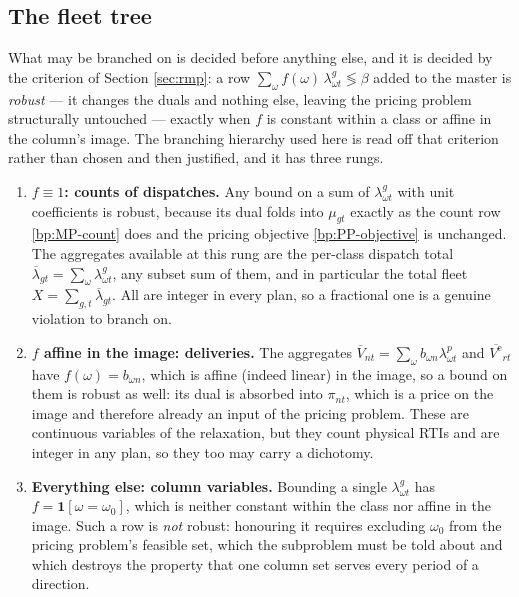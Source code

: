 \subsection{The fleet tree}
\label{sec:branching}

What may be branched on is decided before anything else, and it is
decided by the criterion of Section \ref{sec:rmp}: a row
$\sum_{\omega}f(\omega)\,\lambda^{g}_{\omega t}\lessgtr\beta$ added to
the master is \emph{robust} --- it changes the duals and nothing else,
leaving the pricing problem structurally untouched --- exactly when
$f$ is constant within a class or affine in the column's image. The
branching hierarchy used here is read off that criterion rather than
chosen and then justified, and it has three rungs.

\begin{enumerate}
\item \textbf{$f\equiv1$: counts of dispatches.} Any bound on a sum of
  $\lambda^{g}_{\omega t}$ with unit coefficients is robust, because its
  dual folds into $\mu_{gt}$ exactly as the count row
  \eqref{bp:MP-count} does and the pricing objective
  \eqref{bp:PP-objective} is unchanged. The aggregates available at
  this rung are the per-class dispatch total
  $\overline{\lambda}_{gt}=\sum_{\omega}\lambda^{g}_{\omega t}$, any
  subset sum of them, and in particular the total fleet
  $X=\sum_{g,t}\overline{\lambda}_{gt}$. All are integer in every plan,
  so a fractional one is a genuine violation to branch on.
\item \textbf{$f$ affine in the image: deliveries.} The aggregates
  $\overline{V}_{nt}=\sum_{\omega}b_{\omega n}\lambda^{p}_{\omega t}$
  and $\overline{V^{\mathrm{e}}}_{rt}$ have $f(\omega)=b_{\omega n}$,
  which is affine (indeed linear) in the image, so a bound on them is
  robust as well: its dual is absorbed into $\pi_{nt}$, which is a price
  on the image and therefore already an input of the pricing problem.
  These are continuous variables of the relaxation, but they count
  physical RTIs and are integer in any plan, so they too may carry a
  dichotomy.
\item \textbf{Everything else: column variables.} Bounding a single
  $\lambda^{g}_{\omega t}$ has $f=\mathbf{1}[\omega=\omega_{0}]$, which
  is neither constant within the class nor affine in the image. Such a
  row is \emph{not} robust: honouring it requires excluding $\omega_{0}$
  from the pricing problem's feasible set, which the subproblem must be
  told about and which destroys the property that one column set serves
  every period of a direction.
\end{enumerate}

